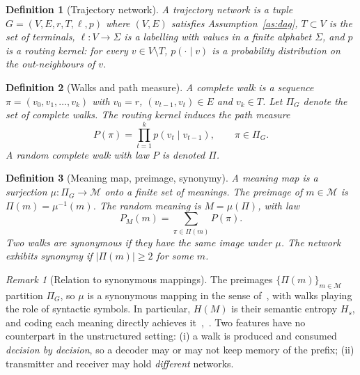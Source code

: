 \documentclass[11pt]{article}
\newtheorem{definition}{Definition}
\theoremstyle{remark}
\newtheorem{remark}{Remark}
\newcommand{\M}{\mathcal{M}}
\newcommand{\Pset}{\Pi}
\begin{document}
\begin{definition}[Trajectory network]\label{def:tn}
A trajectory network is a tuple $G=(V,E,r,T,\ell,p)$ where $(V,E)$ satisfies Assumption~\ref{as:dag}, $T\subset V$ is the set of terminals, $\ell:V\to\Sigma$ is a labelling with values in a finite alphabet $\Sigma$, and $p$ is a routing kernel: for every $v\in V\setminus T$, $p(\cdot\mid v)$ is a probability distribution on the out-neighbours of $v$.
\end{definition}

\begin{definition}[Walks and path measure]\label{def:path}
A \emph{complete walk} is a sequence $\pi=(v_0,v_1,\dots,v_k)$ with $v_0=r$, $(v_{t-1},v_t)\in E$ and $v_k\in T$. Let $\Pset_G$ denote the set of complete walks. The routing kernel induces the \emph{path measure}
\begin{equation}\label{eq:pathmeasure}
P(\pi)=\prod_{t=1}^{k} p(v_t\mid v_{t-1}),\qquad \pi\in\Pset_G .
\end{equation}
A random complete walk with law $P$ is denoted $\Pi$.
\end{definition}

\begin{definition}[Meaning map, preimage, synonymy]\label{def:meaning}
A \emph{meaning map} is a surjection $\mu:\Pset_G\to\M$ onto a finite set of meanings. The \emph{preimage} of $m\in\M$ is $\Pset(m)=\mu^{-1}(m)$. The random meaning is $M=\mu(\Pi)$, with law
\begin{equation}\label{eq:meaninglaw}
P_M(m)=\sum_{\pi\in\Pset(m)}P(\pi).
\end{equation}
Two walks are \emph{synonymous} if they have the same image under $\mu$. The network exhibits synonymy if $|\Pset(m)|\ge 2$ for some $m$.
\end{definition}

\begin{remark}[Relation to synonymous mappings]\label{rem:niu}
The preimages $\{\Pset(m)\}_{m\in\M}$ partition $\Pset_G$, so $\mu$ is a synonymous mapping in the sense of~\cite[Def.~2.1]{niu2025}, with walks playing the role of syntactic symbols. In particular, $H(M)$ is their semantic entropy $H_s$, and coding each meaning directly achieves it~\cite[Thm.~6.8]{niu2025},~\cite{liang2025}. Two features have no counterpart in the unstructured setting: (i) a walk is produced and consumed \emph{decision by decision}, so a decoder may or may not keep memory of the prefix; (ii) transmitter and receiver may hold \emph{different} networks.
\end{remark}
\end{document}

